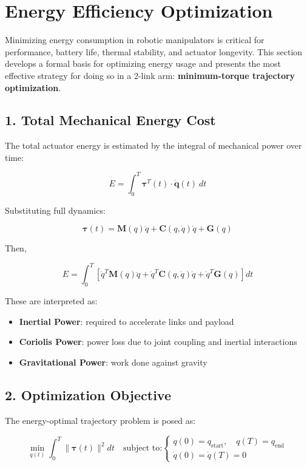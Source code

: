\documentclass[a4paper,12pt]{article}
\begin{document}
\section{Energy Efficiency Optimization} \label{sec:efficiency}

Minimizing energy consumption in robotic manipulators is critical for performance, battery life, thermal stability, and actuator longevity. This section develops a formal basis for optimizing energy usage and presents the most effective strategy for doing so in a 2-link arm: \textbf{minimum-torque trajectory optimization}.

\subsection*{1. Total Mechanical Energy Cost}

The total actuator energy is estimated by the integral of mechanical power over time:

\[
E = \int_0^T \boldsymbol{\tau}^T(t) \cdot \dot{\boldsymbol{q}}(t)~dt
\]

Substituting full dynamics:

\[
\boldsymbol{\tau}(t) = \mathbf{M}(q)\ddot{q} + \mathbf{C}(q, \dot{q})\dot{q} + \mathbf{G}(q)
\]

Then,

\[
E = \int_0^T \left[ \dot{q}^T \mathbf{M}(q)\ddot{q} + \dot{q}^T \mathbf{C}(q, \dot{q})\dot{q} + \dot{q}^T \mathbf{G}(q) \right] dt
\]

\noindent These are interpreted as:
\begin{itemize}
    \item \textbf{Inertial Power}: required to accelerate links and payload
    \item \textbf{Coriolis Power}: power loss due to joint coupling and inertial interactions
    \item \textbf{Gravitational Power}: work done against gravity
\end{itemize}

\subsection*{2. Optimization Objective}

The energy-optimal trajectory problem is posed as:

\[
\min_{q(t)} \int_0^T \| \boldsymbol{\tau}(t) \|^2 dt
\quad \text{subject to:}
\begin{cases}
q(0) = q_{\text{start}}, \quad q(T) = q_{\text{end}} \\
\dot{q}(0) = \dot{q}(T) = 0
\end{cases}
\]
\end{document}

